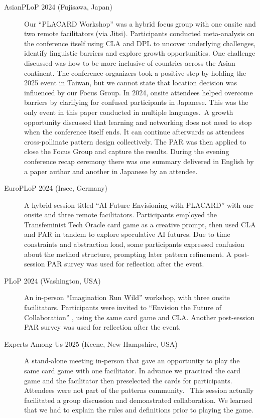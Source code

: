 \documentclass[acmlarge,timestamp]{acmart}
\begin{document}
\begin{description}
\item[AsianPLoP 2024 (Fujisawa, Japan)]{Our “PLACARD Workshop”
  \cite{Danoff2024} was a hybrid focus group with one onsite and two
  remote facilitators (via Jitsi). Participants conducted
  meta-analysis on the conference itself using CLA and DPL to uncover
  underlying challenges, identify linguistic barriers and explore
  growth opportunities. One challenge discussed was how to be more
  inclusive of countries across the Asian continent. The conference
  organizers took a positive step by holding the 2025 event in Taiwan,
  but we cannot state that location decision was influenced by our
  Focus Group. In 2024, onsite attendees helped overcome barriers by clarifying
  for confused participants in Japanese. This was the only event in
  this paper conducted in multiple languages.}{~A growth opportunity
  discussed that learning and networking does not need to stop when
  the conference itself ends. It can continue afterwards as attendees
  cross-pollinate pattern design collectively. The PAR was then
  applied to close the Focus Group and capture the results. During the
  evening conference recap ceremony there was one summary delivered in
  English by a paper author and another in Japanese by an attendee.}
\item[EuroPLoP 2024 (Irsee, Germany)]{A hybrid session titled “AI
  Future Envisioning with PLACARD” \cite{Tedeschi2024} with one
  onsite and three remote facilitators. Participants employed the
  Transfeminist Tech Oracle card game as a creative prompt, then used
  CLA and PAR in tandem to explore speculative AI futures. Due to time
  constraints and abstraction load, some participants expressed
  confusion about the method structure, prompting later pattern
  refinement. A post-session PAR survey was used for reflection after
  the event.}
\item[PLoP 2024 (Washington, USA)]{An in-person “Imagination Run
  Wild” workshop, with three onsite facilitators. Participants were
  invited to “Envision the Future of Collaboration” \cite{ayloo2024},
  using the same card game and CLA.  Another post-session PAR survey
  was used for reflection after the event.}
\item[Experts Among Us 2025 (Keene, New Hampshire, USA)]{A
  stand-alone meeting in-person that gave an opportunity to play the
  same card game with one facilitator. In advance we practiced the
  card game and the facilitator then preselected the cards for
  participants. Attendees were not part of the patterns
  community. ~This session actually facilitated a group discussion
  and demonstrated collaboration. We learned that we had to explain
  the rules and definitions prior to playing the game.}
\end{description}
\end{document}
